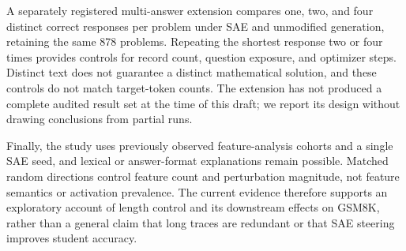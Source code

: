 A separately registered multi-answer extension compares one, two, and four distinct correct responses per problem under SAE and unmodified generation, retaining the same 878 problems.
Repeating the shortest response two or four times provides controls for record count, question exposure, and optimizer steps.
Distinct text does not guarantee a distinct mathematical solution, and these controls do not match target-token counts.
The extension has not produced a complete audited result set at the time of this draft; we report its design without drawing conclusions from partial runs.

Finally, the study uses previously observed feature-analysis cohorts and a single SAE seed, and lexical or answer-format explanations remain possible.
Matched random directions control feature count and perturbation magnitude, not feature semantics or activation prevalence.
The current evidence therefore supports an exploratory account of length control and its downstream effects on GSM8K, rather than a general claim that long traces are redundant or that SAE steering improves student accuracy.

